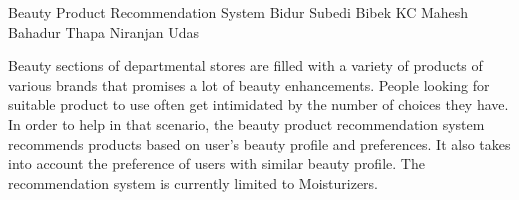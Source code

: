  \begin{conf-abstract}
 {Beauty Product Recommendation System}
 {Bidur Subedi
 	Bibek KC
 	Mahesh Bahadur    Thapa
 	Niranjan Udas
 }
{}

 Beauty sections of departmental stores are filled with a variety of products of various brands that promises a lot of beauty enhancements. People looking for suitable product to use often get intimidated by the number of choices they have. In order to help in that scenario, the beauty product recommendation system recommends products based on user's beauty profile and preferences. It also takes into account the preference of users with similar beauty profile. The recommendation system is currently limited to Moisturizers.
 \end{conf-abstract}